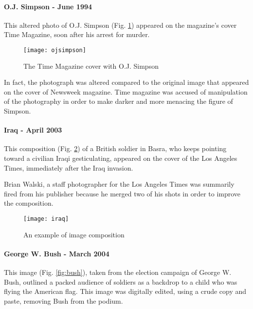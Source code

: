 \paragraph{O.J. Simpson - June 1994}

This altered photo of O.J. Simpson (Fig. \ref{fig:ojsimpson}) appeared on the magazine's cover Time Magazine, soon after his arrest for murder. 

\begin{figure}[!h]
  \begin{center}
    \texttt{[image: ojsimpson]}
  \end{center}
  \caption{The Time Magazine cover with O.J. Simpson}\label{fig:ojsimpson}
\end{figure}

In fact, the photograph was altered compared to the original image that appeared on the cover of Newsweek magazine. Time magazine was accused of manipulation of the photography in order to make darker and more menacing the figure of Simpson.

\paragraph{Iraq - April 2003}

This composition (Fig. \ref{fig:iraq}) of a British soldier in Basra, who keeps pointing toward a civilian Iraqi gesticulating, appeared on the cover of the Los Angeles Times, immediately after the Iraq invasion. 

Brian Walski, a staff photographer for the Los Angeles Times was summarily fired from his publisher because he merged two of his shots in order to improve the composition.

\begin{figure}[!h]
  \begin{center}
    \texttt{[image: iraq]}
  \end{center}
  \caption{An example of image composition}\label{fig:iraq}
\end{figure}

\paragraph{George W. Bush - March 2004}

This image (Fig. \ref{fig:bush}), taken from the election campaign of George W. Bush, outlined a packed audience of soldiers as a backdrop to a child who was flying the American flag. This image was digitally edited, using a crude copy and paste, removing Bush from the podium. 

